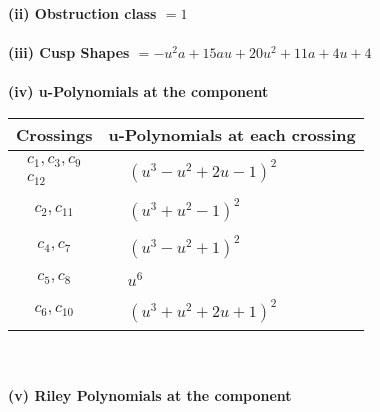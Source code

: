 \documentclass[1p]{elsarticle_modified}
\theoremstyle{definition}
\begin{document}
\flushleft \textbf{(ii) Obstruction class $= 1$}\\~\\
\flushleft \textbf{(iii) Cusp Shapes $= - u^2 a+15 a u+20 u^2+11 a+4 u+4$}\\~\\
\newpage\renewcommand{\arraystretch}{1}
\flushleft \textbf{(iv) u-Polynomials at the component}\newline \\
\begin{tabular}{m{50pt}|m{274pt}}
Crossings & \hspace{64pt}u-Polynomials at each crossing \\
\hline $$\begin{aligned}c_{1},c_{3},c_{9}\\c_{12}\end{aligned}$$&$\begin{aligned}
&(u^3- u^2+2 u-1)^2
\end{aligned}$\\
\hline $$\begin{aligned}c_{2},c_{11}\end{aligned}$$&$\begin{aligned}
&(u^3+u^2-1)^2
\end{aligned}$\\
\hline $$\begin{aligned}c_{4},c_{7}\end{aligned}$$&$\begin{aligned}
&(u^3- u^2+1)^2
\end{aligned}$\\
\hline $$\begin{aligned}c_{5},c_{8}\end{aligned}$$&$\begin{aligned}
&u^6
\end{aligned}$\\
\hline $$\begin{aligned}c_{6},c_{10}\end{aligned}$$&$\begin{aligned}
&(u^3+u^2+2 u+1)^2
\end{aligned}$\\
\hline
\end{tabular}\\~\\
\newpage\renewcommand{\arraystretch}{1}
\flushleft \textbf{(v) Riley Polynomials at the component}\newline \\
\end{document}
